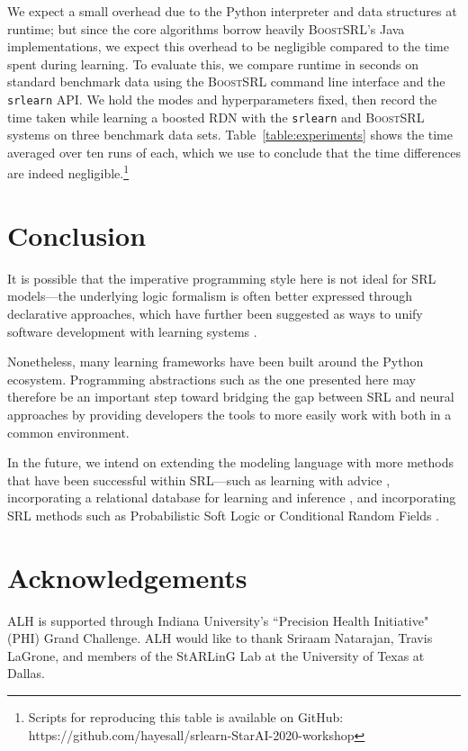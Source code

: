 \documentclass[letterpaper]{article}
\begin{document}
We expect a small overhead due to the Python interpreter and data
structures at runtime; but since the core algorithms borrow heavily \textsc{BoostSRL}'s
Java implementations, we expect this overhead to be negligible compared to the time
spent during learning.
To evaluate this, we compare runtime in seconds on standard benchmark data using
the \textsc{BoostSRL} command line interface and the \texttt{srlearn} API.
We hold the modes and hyperparameters fixed,
then record the time taken while learning a boosted RDN with the \texttt{srlearn} and
\textsc{BoostSRL} systems on three benchmark data sets. Table~\ref{table:experiments}
shows the time averaged over ten runs of each, which we use to conclude
that the time differences are indeed
negligible.\footnote{Scripts for reproducing this table is available on GitHub: https://github.com/hayesall/srlearn-StarAI-2020-workshop}

\section{Conclusion}

It is possible that the imperative programming style here is not ideal
for SRL models---the underlying logic formalism is often better
expressed through declarative approaches, which have further been suggested as ways to unify software
development with learning systems \cite{kordjamshidi2018systems}.

Nonetheless, many learning frameworks have been built around the
Python ecosystem. Programming abstractions such as the one presented here
may therefore be an important step toward bridging the gap between SRL
and neural approaches by providing developers the tools to more easily work with both in
a common environment.

In the future, we intend on extending the modeling language with more methods
that have been successful within SRL---such as learning
with advice \cite{odom2018human}, incorporating a relational database for learning
and inference \cite{malec2017inductive}, and incorporating SRL methods such as
Probabilistic Soft Logic \cite{bach2015hinge} or Conditional Random Fields \cite{sutton2007inductive}.

\section{Acknowledgements}

ALH is supported through Indiana University's ``Precision Health Initiative" (PHI) Grand Challenge.
ALH would like to thank Sriraam Natarajan, Travis LaGrone, and members of the StARLinG Lab at the University of
Texas at Dallas.



\end{document}
